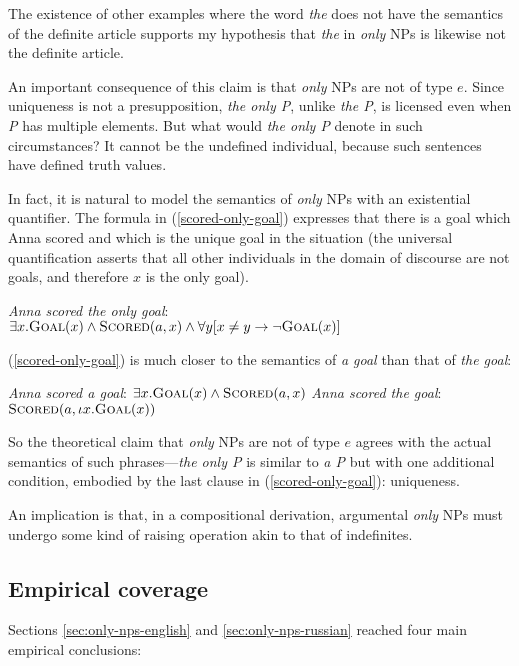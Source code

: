 The existence of other examples where the word \textit{the} does not have the semantics of the definite article supports my hypothesis that \textit{the} in \textit{only} NPs is likewise not the definite article.

An important consequence of this claim is that \textit{only} NPs are not of type $e$. Since uniqueness is not a presupposition, \textit{the only P}, unlike \textit{the P}, is licensed even when \textit{P} has multiple elements. But what would \textit{the only P} denote in such circumstances? It cannot be the undefined individual, because such sentences have defined truth values.

In fact, it is natural to model the semantics of \textit{only} NPs with an existential quantifier. The formula in (\ref{scored-only-goal}) expresses that there is a goal which Anna scored and which is the unique goal in the situation (the universal quantification asserts that all other individuals in the domain of discourse are not goals, and therefore $x$ is the only goal).

\begin{exe}
	\ex \label{scored-only-goal} \textit{Anna scored the only goal}: \\ $\exists x . \textsc{Goal}(x) \land \textsc{Scored}(a, x) \land \forall y [ x \ne y \to \neg \textsc{Goal}(x) ] $
\end{exe}

(\ref{scored-only-goal}) is much closer to the semantics of \textit{a goal} than that of \textit{the goal}:

\begin{exe}
	\ex \label{a-goal} \textit{Anna scored a goal}: $\exists x . \textsc{Goal}(x) \land \textsc{Scored}(a, x)$
	\ex \label{the-goal} \textit{Anna scored the goal}: $\textsc{Scored}(a, \iota x . \textsc{Goal}(x))$
\end{exe}

So the theoretical claim that \textit{only} NPs are not of type $e$ agrees with the actual semantics of such phrases---\textit{the only P} is similar to \textit{a P} but with one additional condition, embodied by the last clause in (\ref{scored-only-goal}): uniqueness.

An implication is that, in a compositional derivation, argumental \textit{only} NPs must undergo some kind of raising operation akin to that of indefinites.

\subsection{Empirical coverage}
Sections \ref{sec:only-nps-english} and \ref{sec:only-nps-russian} reached four main empirical conclusions:

